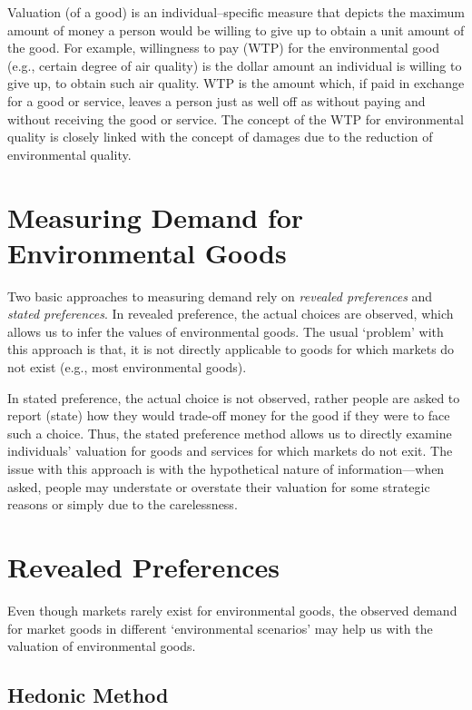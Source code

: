 \documentclass[
]{book}
\begin{document}
Valuation (of a good) is an individual--specific measure that depicts the maximum amount of money a person would be willing to give up to obtain a unit amount of the good. For example, willingness to pay (WTP) for the environmental good (e.g., certain degree of air quality) is the dollar amount an individual is willing to give up, to obtain such air quality. WTP is the amount which, if paid in exchange for a good or service, leaves a person just as well off as without paying and without receiving the good or service. The concept of the WTP for environmental quality is closely linked with the concept of damages due to the reduction of environmental quality.

\hypertarget{measuring-demand-for-environmental-goods}{%
\section{Measuring Demand for Environmental Goods}\label{measuring-demand-for-environmental-goods}}

Two basic approaches to measuring demand rely on \emph{revealed preferences} and \emph{stated preferences}. In revealed preference, the actual choices are observed, which allows us to infer the values of environmental goods. The usual `problem' with this approach is that, it is not directly applicable to goods for which markets do not exist (e.g., most environmental goods).

In stated preference, the actual choice is not observed, rather people are asked to report (state) how they would trade-off money for the good if they were to face such a choice. Thus, the stated preference method allows us to directly examine individuals' valuation for goods and services for which markets do not exit. The issue with this approach is with the hypothetical nature of information---when asked, people may understate or overstate their valuation for some strategic reasons or simply due to the carelessness.

\hypertarget{revealed-preferences}{%
\section{Revealed Preferences}\label{revealed-preferences}}

Even though markets rarely exist for environmental goods, the observed demand for market goods in different `environmental scenarios' may help us with the valuation of environmental goods.

\hypertarget{hedonic-method}{%
\subsection{Hedonic Method}\label{hedonic-method}}
\end{document}
